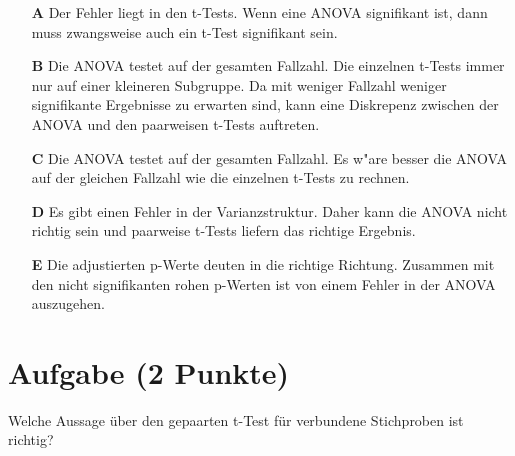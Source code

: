 \documentclass[a4paper, 10pt]{scrartcl}\usepackage[]{graphicx}\usepackage[]{xcolor}
\begin{document}
\begin{enumerate}
\item [\textbf{A} \msquare] Der Fehler liegt in den t-Tests. Wenn eine ANOVA signifikant ist, dann muss zwangsweise auch ein t-Test signifikant sein.
\item [\textbf{B} \msquare] Die ANOVA testet auf der gesamten Fallzahl. Die einzelnen t-Tests immer nur auf einer kleineren Subgruppe. Da mit weniger Fallzahl weniger signifikante Ergebnisse zu erwarten sind, kann eine Diskrepenz zwischen der ANOVA und den paarweisen t-Tests auftreten.
\item [\textbf{C} \msquare] Die ANOVA testet auf der gesamten Fallzahl. Es w{"a}re besser die ANOVA auf der gleichen Fallzahl wie die einzelnen t-Tests zu rechnen.
\item [\textbf{D} \msquare] Es gibt einen Fehler in der Varianzstruktur. Daher kann die ANOVA nicht richtig sein und paarweise t-Tests liefern das richtige Ergebnis.
\item [\textbf{E} \msquare] Die adjustierten p-Werte deuten in die richtige Richtung. Zusammen mit den nicht signifikanten rohen p-Werten ist von einem Fehler in der ANOVA auszugehen.
\end{enumerate}

\section{Aufgabe \hfill (2 Punkte)}

Welche Aussage {\"u}ber den gepaarten t-Test f{\"u}r verbundene Stichproben ist richtig?
\end{document}
